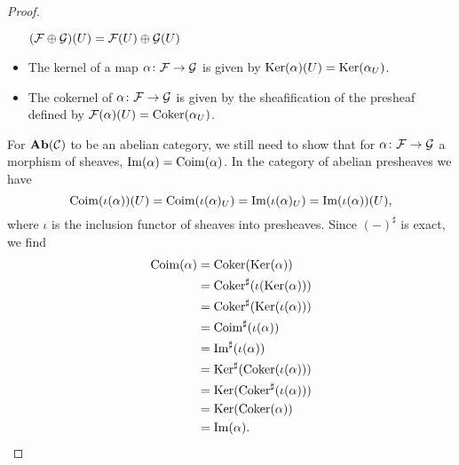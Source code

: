 \documentclass{article}
\begin{document}
\begin{proof}
\begin{itemize}
              $(\mathcal{F} \oplus \mathcal{G} )(U) = \mathcal{F}(U) \oplus \mathcal{G}(U)$
        \item The kernel of a map $\alpha \colon \mathcal{F} \to \mathcal{G}$ is given by
              $\operatorname{Ker}(\alpha)(U) = \operatorname{Ker}(\alpha_U)$.
        \item The cokernel of $\alpha \colon \mathcal{F} \to \mathcal{G}$
              is given by the sheafification of the presheaf defined by
              $\mathcal{F}(\alpha)(U) = \operatorname{Coker}(\alpha_U)$.
    \end{itemize}
    For $\operatorname{\mathbf{Ab}}(\mathcal{C})$ to be an abelian category, we still need to
    show that for $\alpha \colon \mathcal{F} \to \mathcal{G}$ a morphism of sheaves,
    $\operatorname{Im}(\alpha) = \operatorname{Coim}(\alpha)$. In the category of abelian presheaves we have
    \begin{equation*}
        \operatorname{Coim}(\iota(\alpha))(U) = \operatorname{Coim}(\iota(\alpha)_U)
        = \operatorname{Im}(\iota(\alpha)_U) = \operatorname{Im}(\iota(\alpha))(U),
    \end{equation*}
    where $\iota$ is the inclusion functor of sheaves into presheaves.
    Since $(-)^\sharp$ is exact, we find
    \begin{align*}
        \operatorname{Coim}(\alpha)
         & = \operatorname{Coker}(\operatorname{Ker}(\alpha))               \\
         & = \operatorname{Coker}^\sharp(\iota(\operatorname{Ker}(\alpha))) \\
         & = \operatorname{Coker}^\sharp(\operatorname{Ker}(\iota(\alpha))) \\
         & = \operatorname{Coim}^\sharp(\iota(\alpha))       \\
         & = \operatorname{Im}^\sharp(\iota(\alpha))         \\
         & = \operatorname{Ker}^\sharp(\operatorname{Coker}(\iota(\alpha))) \\
         & = \operatorname{Ker}(\operatorname{Coker}^\sharp(\iota(\alpha))) \\
         & = \operatorname{Ker}(\operatorname{Coker}(\alpha))               \\
         & = \operatorname{Im}(\alpha).
    \end{align*}
\end{proof}
\end{document}
